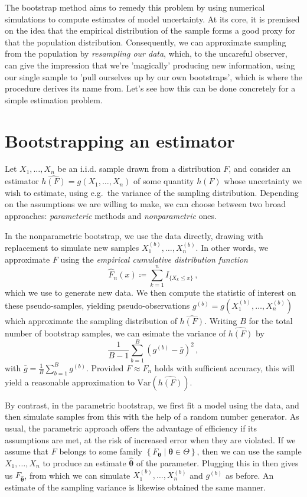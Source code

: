 \documentclass[a4paper]{book}
\begin{document}
The bootstrap method aims to remedy this problem by using numerical simulations to compute estimates of model uncertainty. At its core, it is premised on the idea that the empirical distribution of the sample forms a good proxy for that the population distribution. Consequently, we can approximate sampling from the population by \emph{resampling our data}, which, to the uncareful observer, can give the impression that we're 'magically' producing new information, using our single sample to 'pull ourselves up by our own bootstraps', which is where the procedure derives its name from. Let's see how this can be done concretely for a simple estimation problem.

\section{Bootstrapping an estimator}

Let $X_1, \dots, X_n$ be an i.i.d. sample drawn from a distribution $F$, and consider an estimator $\widehat{h(F)} = g(X_1, \dots, X_n)$ of some quantity $h(F)$ whose uncertainty we wish to estimate, using e.g.\ the variance of the sampling distribution. Depending on the assumptions we are willing to make, we can choose between two broad approaches: \emph{parameteric} methods and \emph{nonparametric} ones.

In the nonparametric bootstrap, we use the data directly, drawing with replacement to simulate new samples $X^{(b)}_1, \dots, X^{(b)}_n$. In other words, we approximate $F$ using the \emph{empirical cumulative distribution function}
\begin{equation}
  \widehat{F}_n(x) \coloneqq \sum_{k=1}^n I_{\{ X_k \leq x \}} \,,
\end{equation}
which we use to generate new data. We then compute the statistic of interest on these pseudo-samples, yielding pseudo-observations $g^{(b)} = g(X^{(b)}_1, \dots, X^{(b)}_n)$ which approximate the sampling distribution of $\widehat{h(F)}$. Writing $B$ for the total number of bootstrap samples, we can esimate the variance of $\widehat{h(F)}$ by
\begin{equation}
  \frac{1}{B-1}\sum_{b=1}^B(g^{(b)} - \bar{g})^2 \,,
\end{equation}
with $\bar{g} = \frac{1}{B} \sum_{b=1}^B g^{(b)}$. Provided $F \approx \widehat{F}_n$ holds with sufficient accuracy, this will yield a reasonable approximation to $\mathrm{Var}(\widehat{h(F)})$.

By contrast, in the parametric bootstrap, we first fit a model using the data, and then simulate samples from this with the help of a random number generator. As usual, the parametric approach offers the advantage of efficiency if its assumptions are met, at the risk of increased error when they are violated. If we assume that $F$ belongs to some family $\left \{ F_{\bm{\theta}} \mid  \bm{\theta} \in \Theta \right \}$, then we can use the sample $X_1, \dots, X_n$ to produce an estimate $\bm{\widehat{\theta}}$ of the parameter. Plugging this in then gives us $F_{\bm{\widehat{\theta}}}$, from which we can simulate $X^{(b)}_1, \dots , X^{(b)}_n$ and $g^{(b)}$ as before. An estimate of the sampling variance is likewise obtained the same manner.
\end{document}
